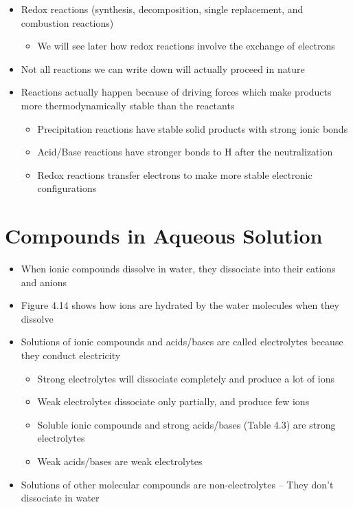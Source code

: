 \documentclass[12pt, openany, letterpaper]{memoir}
\begin{document}
\begin{itemize}
\begin{itemize}
	\end{itemize}
	\item Redox reactions (synthesis, decomposition, single replacement, and combustion reactions)
	\begin{itemize}
		\item We will see later how redox reactions involve the exchange of electrons
	\end{itemize}
	\item Not all reactions we can write down will actually proceed in nature
	\item Reactions actually happen because of driving forces which make products more thermodynamically stable than the reactants
	\begin{itemize}
		\item Precipitation reactions have stable solid products with strong ionic bonds
		\item Acid/Base reactions have stronger bonds to H after the neutralization
		\item Redox reactions transfer electrons to make more stable electronic configurations
	\end{itemize}
\end{itemize}
\section{Compounds in Aqueous Solution}
\begin{itemize}
	\item When ionic compounds dissolve in water, they dissociate into their cations and anions
	\item Figure 4.14 shows how ions are hydrated by the water molecules when they dissolve
	\item Solutions of ionic compounds and acids/bases are called electrolytes because they conduct electricity
	\begin{itemize}
		\item Strong electrolytes will dissociate completely and produce a lot of ions		
		\item Weak electrolytes dissociate only partially, and produce few ions
		\item Soluble ionic compounds and strong acids/bases (Table 4.3) are strong electrolytes
		\item Weak acids/bases are weak electrolytes
	\end{itemize}
	\item Solutions of other molecular compounds are non-electrolytes -- They don't dissociate in water
\end{itemize}
\end{document}
